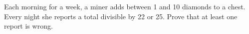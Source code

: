 Each morning for a week, a miner adds between 1 and 10 diamonds to a chest. Every night she reports a total divisible by 22 or 25. Prove that at least one report is wrong.
